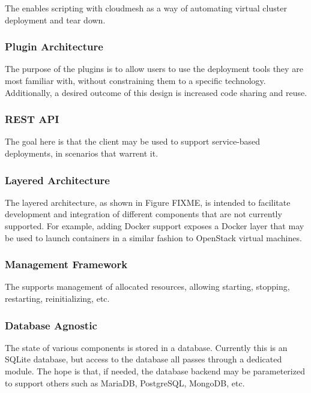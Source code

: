 \documentclass[9pt,twocolumn,twoside]{styles/osajnl}
\begin{document}
The enables scripting with cloudmesh as a way of automating virtual cluster deployment and tear down.


\subsubsection{Plugin Architecture}

The purpose of the plugins is to allow users to use the deployment tools they are most familiar with, without constraining them to a specific technology. Additionally, a desired outcome of this design is increased code sharing and reuse.


\subsubsection{REST API}

The goal here is that the client may be used to support service-based deployments, in scenarios that warrent it.


\subsubsection{Layered Architecture}

The layered architecture, as shown in Figure FIXME, is intended to facilitate development and integration of different components that are not currently supported. For example, adding Docker support exposes a Docker layer that may be used to launch containers in a similar fashion to OpenStack virtual machines.


\subsubsection{Management Framework}

The supports management of allocated resources, allowing starting, stopping, restarting, reinitializing, etc.


\subsubsection{Database Agnostic}

The state of various components is stored in a database. Currently this is an SQLite database, but access to the database all passes through a dedicated module. The hope is that, if needed, the database backend may be parameterized to support others such as MariaDB, PostgreSQL, MongoDB, etc.
\end{document}
